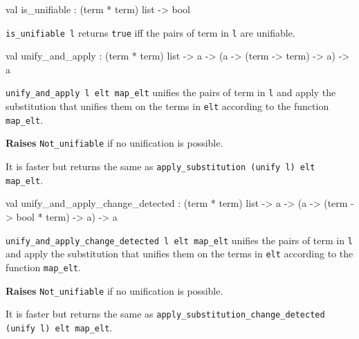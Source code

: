 \label{val:Term.is-underscoreunifiable}\begin{ocamldoccode}
val is_unifiable : (term * term) list -> bool
\end{ocamldoccode}
\begin{ocamldocdescription}
{\tt{is\_unifiable l}} returns {\tt{true}} iff the pairs of term in {\tt{l}} are unifiable.


\end{ocamldocdescription}




\label{val:Term.unify-underscoreand-underscoreapply}\begin{ocamldoccode}
val unify_and_apply :
  (term * term) list ->
  {\textquotesingle}a -> ({\textquotesingle}a -> (term -> term) -> {\textquotesingle}a) -> {\textquotesingle}a
\end{ocamldoccode}
\begin{ocamldocdescription}
{\tt{unify\_and\_apply l elt map\_elt}} unifies the pairs of term in {\tt{l}} and apply the substitution that unifies them
    on the terms in {\tt{elt}} according to the function {\tt{map\_elt}}.

{\bf Raises} {\tt{Not\_unifiable}} if no unification is possible.


    It is faster but returns the same as {\tt{apply\_substitution (unify l) elt map\_elt}}.


\end{ocamldocdescription}




\label{val:Term.unify-underscoreand-underscoreapply-underscorechange-underscoredetected}\begin{ocamldoccode}
val unify_and_apply_change_detected :
  (term * term) list ->
  {\textquotesingle}a -> ({\textquotesingle}a -> (term -> bool * term) -> {\textquotesingle}a) -> {\textquotesingle}a
\end{ocamldoccode}
\begin{ocamldocdescription}
{\tt{unify\_and\_apply\_change\_detected l elt map\_elt}} unifies the pairs of term in {\tt{l}} and apply the substitution that unifies them
    on the terms in {\tt{elt}} according to the function {\tt{map\_elt}}.

{\bf Raises} {\tt{Not\_unifiable}} if no unification is possible.


    It is faster but returns the same as {\tt{apply\_substitution\_change\_detected (unify l) elt map\_elt}}.


\end{ocamldocdescription}




